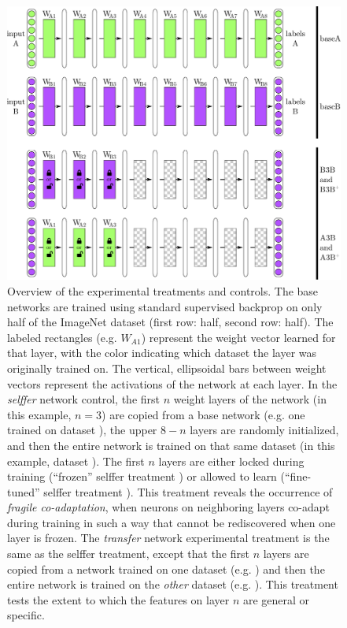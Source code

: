 \begin{figure}[t]
\begin{center}
\includegraphics[width=.84\linewidth]{drawings/transfer.pdf}
\end{center}
\caption{Overview of the experimental treatments and controls.  The base networks are trained using standard supervised backprop on only half of the ImageNet dataset (first row: \dA half, second row: \dB half).
The labeled rectangles (e.g. $W_{A1}$) represent the weight vector learned for that layer, with the color indicating which dataset the layer was originally trained on. The vertical, ellipsoidal bars between weight vectors represent the activations of the network at each layer.
 In the \emph{selffer} network control, the first $n$ weight layers of the network (in this example, $n=3$) are copied from a base network (e.g. one trained on dataset \dB), the upper $8-n$ layers are randomly initialized, and then the entire network is trained on that same dataset (in this example, dataset \dB). The first $n$ layers are either locked during training (``frozen'' selffer treatment ) or allowed to learn (``fine-tuned'' selffer treatment ). This treatment reveals the occurrence of \emph{fragile co-adaptation}, when neurons on neighboring layers co-adapt during training in such a way that cannot be rediscovered when one layer is frozen.
 The \emph{transfer} network experimental treatment is the same as the selffer treatment, except that the first $n$ layers are copied from a network trained on one dataset (e.g. \dA) and then the entire network is trained on the \emph{other} dataset (e.g. \dB). This treatment tests the extent to which the features on layer $n$ are general or specific.}
\end{figure}

